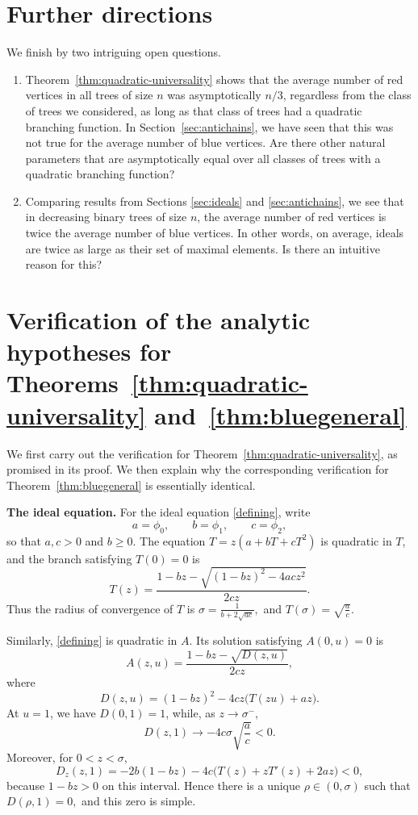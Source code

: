 \documentclass[10pt,a4paper]{amsart}
\theoremstyle{remark}
\begin{document}
\section{Further directions}
We finish by two intriguing open questions. 
\begin{enumerate}
\item Theorem~\ref{thm:quadratic-universality} shows that the average number of red vertices
in all trees of size $n$ was asymptotically $n/3$, regardless from the class of trees we considered, 
as long as that class of trees had a quadratic branching function. In Section~\ref{sec:antichains}, we have seen that this was not true for the average number of blue vertices. Are there other natural parameters that are 
asymptotically equal over all classes of trees with a quadratic branching function?
\item Comparing results from Sections \ref{sec:ideals} and \ref{sec:antichains}, we see that in decreasing binary trees of size $n$, the average number
of red vertices is twice the average number of blue vertices. In other words, on average, ideals are twice as large as their set of maximal elements. Is there an intuitive reason for this? 
\end{enumerate}

\appendix

\section{Verification of the analytic hypotheses for Theorems~\ref{thm:quadratic-universality} and~\ref{thm:bluegeneral}}
\label{app:analytic-verification}

We first carry out the verification for
Theorem~\ref{thm:quadratic-universality}, as promised in its proof.  We then
explain why the corresponding verification for
Theorem~\ref{thm:bluegeneral} is essentially identical.

\medskip
\noindent\textbf{The ideal equation.}
For the ideal
equation \eqref{defining}, write
\[
a=\phi_0,\qquad b=\phi_1,\qquad c=\phi_2,
\]
so that $a,c>0$ and $b\geq 0$.  The equation
$
T=z(a+bT+cT^2)
$
is quadratic in $T$, and the branch satisfying $T(0)=0$ is
\[
T(z)=\frac{1-bz-\sqrt{(1-bz)^2-4ac z^2}}{2cz}.
\]
Thus the radius of convergence of $T$ is
$
\sigma=\frac{1}{b+2\sqrt{ac}},
$
and
$
T(\sigma)=\sqrt{\frac{a}{c}}.
$

Similarly, \eqref{defining} is quadratic in $A$.  Its solution satisfying
$A(0,u)=0$ is
\[
A(z,u)=\frac{1-bz-\sqrt{D(z,u)}}{2cz},
\]
where
\[
D(z,u)=(1-bz)^2-4cz\bigl(T(zu)+az\bigr).
\]
At $u=1$, we have $D(0,1)=1$, while, as $z\to\sigma^-$,
\[
D(z,1)\longrightarrow -4c\sigma\sqrt{\frac{a}{c}}<0.
\]
Moreover, for $0<z<\sigma$,
\[
D_z(z,1)
=-2b(1-bz)-4c\bigl(T(z)+zT'(z)+2az\bigr)<0,
\]
because $1-bz>0$ on this interval.  Hence there is a unique
$\rho\in(0,\sigma)$ such that
$
D(\rho,1)=0,
$
and this zero is simple.
\end{document}
